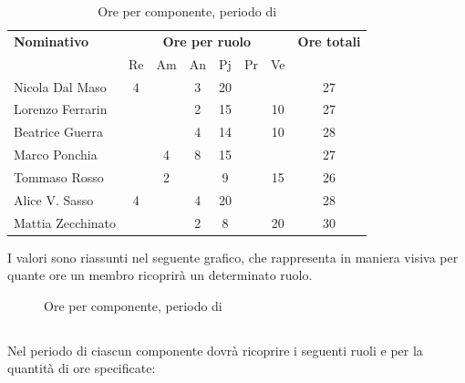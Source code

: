 \begin{table}[H]
	\centering
	\begin{tabular}{|l|c|c|c|c|c|c|c|}
		\hline
		\textbf{Nominativo} & 
		\multicolumn{6}{c|}{\textbf{Ore per ruolo}} & 
		\textbf{Ore totali} \\
		& Re & Am & An & Pj & Pr & Ve & \\
		\hline
		Nicola Dal Maso &4 & &3 &20 & & & 27 \\
		Lorenzo Ferrarin & & &2 &15 & &10 & 27 \\
		Beatrice Guerra & & &4 &14 & &10 & 28 \\
		Marco Ponchia & &4 &8 &15 & & & 27 \\
		Tommaso Rosso & &2 & &9 & &15 & 26 \\
		Alice V. Sasso &4 & &4 &20 & & & 28 \\
		Mattia Zecchinato & & &2 &8 & &20 & 30 \\
		\hline
	\end{tabular}
	\caption{Ore per componente, periodo di \PA{}}
\end{table}
I valori sono riassunti nel seguente grafico, che rappresenta in maniera visiva per quante ore un membro ricoprirà un determinato ruolo.
\begin{figure}[H]
	\centering
	\caption{Ore per componente, periodo di \PA{}}
\end{figure}

\subsection{\PD}
Nel periodo di \PD{} ciascun componente dovrà ricoprire i seguenti ruoli e per la quantità di ore specificate:


